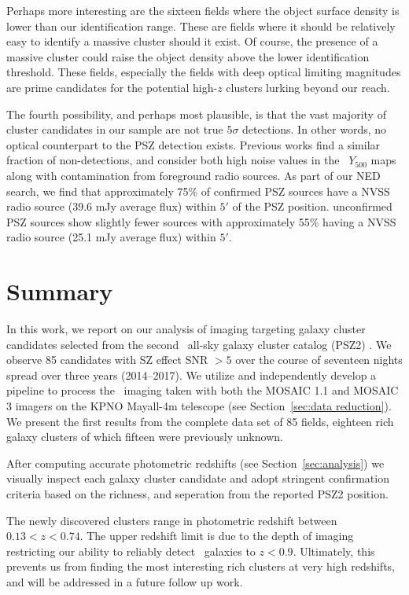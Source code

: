 \documentclass[apj, revtex4-1]{emulateapj}
\begin{document}
Perhaps more interesting are the sixteen fields where the object surface density is lower than our identification range. These are fields where it should be relatively easy to identify a massive cluster should it exist. Of course, the presence of a massive cluster could raise the object density above the lower identification threshold. These fields, especially the fields with deep optical limiting magnitudes are prime candidates for the potential high-$z$ clusters lurking beyond our reach.

The fourth possibility, and perhaps most plausible, is that the vast majority of cluster candidates in our sample are not true $5\sigma$ detections.	In other words, no optical counterpart to the PSZ detection exists. Previous works  find a similar fraction of non-detections, and consider both high noise values in the \planck\ $Y_{500}$ maps \citep{PlanckCollaboration2014a} along with contamination from foreground radio sources. As part of our NED search, we find that approximately 75\% of confirmed PSZ sources have a NVSS radio source (39.6 mJy average flux) within $5'$ of the PSZ position. unconfirmed PSZ sources show slightly fewer sources with approximately 55\% having a NVSS radio source (25.1 mJy average flux) within $5'$.

\section{Summary}\label{sec:summary}

In this work, we report on our analysis of imaging targeting galaxy cluster candidates selected from the second \planck\ all-sky galaxy cluster catalog (PSZ2) \citep{PlanckCollaboration2015a}. We observe 85 candidates with SZ effect SNR $>5$ over the course of seventeen nights spread over three years (2014--2017). We utilize and independently develop a pipeline to process the \sdssg\sdssr\sdssi\sdssz\ imaging taken with both the MOSAIC 1.1 and MOSAIC 3 imagers on the KPNO Mayall-4m telescope (see Section~\ref{sec:data reduction}). We present the first results from the complete data set of 85 fields, eighteen rich galaxy clusters of which fifteen were previously unknown.

After computing accurate photometric redshifts (see Section~\ref{sec:analysis}) we visually inspect each galaxy cluster candidate and adopt stringent confirmation criteria based on the richness, and seperation from the reported PSZ2 position.

The newly discovered clusters range in photometric redshift between $0.13 < z < 0.74$. The upper redshift limit is due to the depth of imaging restricting our ability to reliably detect \lstar\ galaxies to $z<0.9$. Ultimately, this prevents us from finding the most interesting rich clusters at very high redshifts, and will be addressed in a future follow up work.
\end{document}
